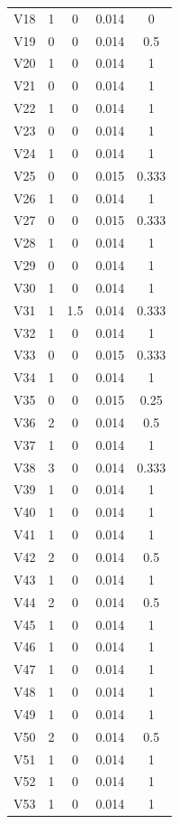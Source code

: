 \documentclass[a4paper, 12pt, openright, oneside, german, french, english, brazil]{abntex2}
\begin{document}
\begin{SingleSpace}
\begin{footnotesize}
\begin{center}
\begin{longtable}{c c c c c}
					V18 & 1 & 0 & 0.014 & 0 \\ 
					V19 & 0 & 0 & 0.014 & 0.5 \\ 
					V20 & 1 & 0 & 0.014 & 1 \\ 
					V21 & 0 & 0 & 0.014 & 1 \\ 
					V22 & 1 & 0 & 0.014 & 1 \\ 
					V23 & 0 & 0 & 0.014 & 1 \\ 
					V24 & 1 & 0 & 0.014 & 1 \\ 
					V25 & 0 & 0 & 0.015 & 0.333 \\ 
					V26 & 1 & 0 & 0.014 & 1 \\ 
					V27 & 0 & 0 & 0.015 & 0.333 \\ 
					V28 & 1 & 0 & 0.014 & 1 \\ 
					V29 & 0 & 0 & 0.014 & 1 \\ 
					V30 & 1 & 0 & 0.014 & 1 \\ 
					V31 & 1 & 1.5 & 0.014 & 0.333 \\ 
					V32 & 1 & 0 & 0.014 & 1 \\ 
					V33 & 0 & 0 & 0.015 & 0.333 \\ 
					V34 & 1 & 0 & 0.014 & 1 \\ 
					V35 & 0 & 0 & 0.015 & 0.25 \\ 
					V36 & 2 & 0 & 0.014 & 0.5 \\ 
					V37 & 1 & 0 & 0.014 & 1 \\ 
					V38 & 3 & 0 & 0.014 & 0.333 \\ 
					V39 & 1 & 0 & 0.014 & 1 \\ 
					V40 & 1 & 0 & 0.014 & 1 \\ 
					V41 & 1 & 0 & 0.014 & 1 \\ 
					V42 & 2 & 0 & 0.014 & 0.5 \\ 
					V43 & 1 & 0 & 0.014 & 1 \\ 
					V44 & 2 & 0 & 0.014 & 0.5 \\ 
					V45 & 1 & 0 & 0.014 & 1 \\ 
					V46 & 1 & 0 & 0.014 & 1 \\ 
					V47 & 1 & 0 & 0.014 & 1 \\ 
					V48 & 1 & 0 & 0.014 & 1 \\ 
					V49 & 1 & 0 & 0.014 & 1 \\ 
					V50 & 2 & 0 & 0.014 & 0.5 \\ 
					V51 & 1 & 0 & 0.014 & 1 \\ 
					V52 & 1 & 0 & 0.014 & 1 \\ 
					V53 & 1 & 0 & 0.014 & 1 \\ 

\end{longtable}
\end{center}
\end{footnotesize}
\end{SingleSpace}
\end{document}
